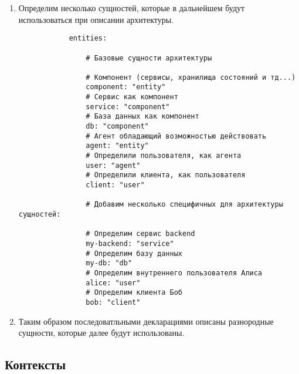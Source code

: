 \documentclass[final]{article}
\begin{document}
        \begin{enumerate}
            \item Определим несколько сущностей, которые в дальнейшем будут
            использоваться при описании архитектуры.

            \begin{verbatim}
            entities:

                # Базовые сущности архитектуры 

                # Компонент (сервисы, хранилища состояний и тд...)
                component: "entity"
                # Сервис как компонент
                service: "component"
                # База данных как компонент
                db: "component"
                # Агент обладающий возможностью действовать
                agent: "entity"
                # Определили пользователя, как агента
                user: "agent"
                # Определили клиента, как пользователя
                client: "user"

                # Добавим несколько специфичных для архитектуры сущностей:

                # Определим сервис backend
                my-backend: "service"
                # Определим базу данных 
                my-db: "db"
                # Определим внутреннего пользователя Алиса
                alice: "user"
                # Определим клиента Боб
                bob: "client"

            \end{verbatim}

            \item Таким образом последоватльными декларациями описаны 
            разнородные сущности, которые далее будут использованы.

        \end{enumerate}


    \subsection{Контексты}
\end{document}
